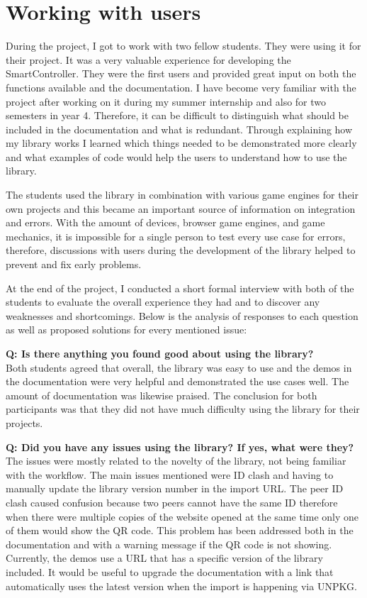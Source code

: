 \documentclass{l4proj}
\begin{document}
\section {Working with users}
During the project, I got to work with two fellow students. They were using it for their project. It was a very valuable experience for developing the SmartController. They were the first users and provided great input on both the functions available and the documentation. I have become very familiar with the project after working on it during my summer internship and also for two semesters in year 4. Therefore, it can be difficult to distinguish what should be included in the documentation and what is redundant. Through explaining how my library works I learned which things needed to be demonstrated more clearly and what examples of code would help the users to understand how to use the library. \par
The students used the library in combination with various game engines for their own projects and this became an important source of information on integration and errors. With the amount of devices, browser game engines, and game mechanics, it is impossible for a single person to test every use case for errors, therefore, discussions with users during the development of the library helped to prevent and fix early problems. \par 
At the end of the project, I conducted a short formal interview with both of the students to evaluate the overall experience they had and to discover any weaknesses and shortcomings. Below is the analysis of responses to each question as well as proposed solutions for every mentioned issue: 

\textbf{Q: Is there anything you found good about using the library?} \\
Both students agreed that overall, the library was easy to use and the demos in the documentation were very helpful and demonstrated the use cases well. The amount of documentation was likewise praised. The conclusion for both participants was that they did not have much difficulty using the library for their projects. \par

\textbf{Q: Did you have any issues using the library? If yes, what were they?} \\
The issues were mostly related to the novelty of the library, not being familiar with the workflow. The main issues mentioned were ID clash and having to manually update the library version number in the import URL. The peer ID clash caused confusion because two peers cannot have the same ID therefore when there were multiple copies of the website opened at the same time only one of them would show the QR code. This problem has been addressed both in the documentation and with a warning message if the QR code is not showing. \\
Currently, the demos use a URL that has a specific version of the library included. It would be useful to upgrade the documentation with a link that automatically uses the latest version when the import is happening via UNPKG. \par
\end{document}

